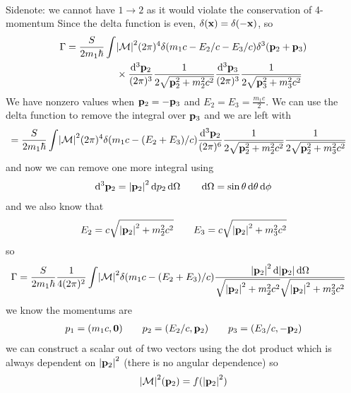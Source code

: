 \documentclass[../main.tex]{subfiles}
\begin{document}
\paragraph*{} Sidenote: we cannot have $1 \to 2$ as it would violate the conservation of 4-momentum 
Since the delta function is even, $\delta(\vb x) = \delta(-\vb x)$, so
\begin{align*}
    \Gamma = \frac{S}{2m_1 \hbar} \int &\abs{\mathcal{M}}^2 (2\pi)^4 \delta(m_1 c - E_2/c - E_3/c) 
    \delta^3 (\vb p_2 + \vb p_3) \\
    &\times \frac{\dd^3 \vb p_2}{(2\pi)^3} \frac{1}{2\sqrt{\vb p_2^2 + m_2^2 c^2}} 
    \frac{\dd^3 \vb p_3}{(2\pi)^3} \frac{1}{2\sqrt{\vb p_3^2 + m_3^2 c^2}}
\end{align*}
We have nonzero values when $\vb p_2 = -\vb p_3$ and $E_2 = E_3 = \frac{m_1 c}{2}$. We can use the
delta function to remove the integral over $\vb p_3$ and we are left with
\begin{align*}
    = \frac{S}{2m_1 \hbar} \int &\abs{\mathcal{M}}^2 (2\pi)^4 \delta(m_1 c - (E_2 + E_3)/c) 
    \frac{\dd^3 \vb p_2}{(2\pi)^6} \frac{1}{2\sqrt{\vb p_2^2 + m_2^2 c^2}}
    \frac{1}{2\sqrt{\vb p_2^2 + m_3^2 c^2}}
\end{align*}
and now we can remove one more integral using
\begin{align*}
    \dd^3 \vb p_2 = \abs{\vb p_2}^2 \dd{p_2} \dd{\Omega} \qquad \dd{\Omega} = \sin\theta \dd{\theta} \dd{\phi}
\end{align*}
and we also know that
\begin{align*}
    E_2 = c\sqrt{\abs{\vb p_2}^2 + m_2^2 c^2} \qquad E_3 = c\sqrt{\abs{\vb p_2}^2 + m_3^2 c^2}
\end{align*}
so
\begin{align*}
    \Gamma = \frac{S}{2m_1\hbar} \frac{1}{4(2\pi)^2} \int &\abs{\mathcal{M}}^2 
    \delta(m_1 c - (E_2 + E_3)/c) 
    \frac{\abs{\vb p_2}^2 \dd{\abs{\vb p_2}} \dd{\Omega}}{\sqrt{\abs{\vb p_2}^2 + m_2^2 c^2} \sqrt{\abs{\vb p_2}^2 + m_3^2 c^2}}
\end{align*}
we know the momentums are
\begin{align*}
    p_1 = (m_1 c, \vb 0) \qquad p_2 = (E_2/c, \vb p_2) \qquad p_3 = (E_3/c, -\vb p_2)
\end{align*}
we can construct a scalar out of two vectors using the dot product which is always dependent on
$\abs{\vb p_2}^2$ (there is no angular dependence) so
\begin{align*}
    \abs{\mathcal{M}}^2 (\vb p_2) = f(\abs{\vb p_2}^2)
\end{align*}
\end{document}

